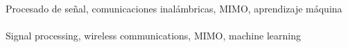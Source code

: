 \vspace{8cm}
\thispagestyle{empty}

\\[0.6cm]
\noindent Procesado de señal, comunicaciones inalámbricas, MIMO, aprendizaje máquina\\[2cm]

\\[0.6cm]
\noindent Signal processing, wireless communications, MIMO, machine learning  \clearpage
